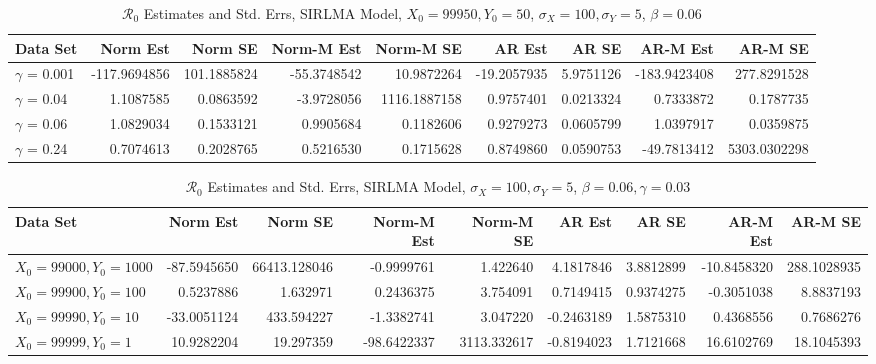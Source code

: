 \documentclass[12pt]{article}
\newcommand{\rr}{\ensuremath{\mathcal{R}_0}}
\begin{document}
\begin{table}[H]
	
	\caption{\label{tab:}$\rr$ Estimates and Std. Errs, SIRLMA Model,
		$X_0 = 99950, Y_0 = 50$, $\sigma_X = 100, \sigma_Y = 5$, $\beta = 0.06$}
	\centering
	\begin{footnotesize}
		\begin{tabular}[t]{l|r|r|r|r|r|r|r|r}
			\hline
			Data Set & Norm Est & Norm SE & Norm-M Est & Norm-M SE & AR Est & AR SE & AR-M Est & AR-M SE\\
			\hline
			$\gamma$ = 0.001 & -117.9694856 & 101.1885824 & -55.3748542 & 10.9872264 & -19.2057935 & 5.9751126 & -183.9423408 & 277.8291528\\
			\hline
			$\gamma$ = 0.04 & 1.1087585 & 0.0863592 & -3.9728056 & 1116.1887158 & 0.9757401 & 0.0213324 & 0.7333872 & 0.1787735\\
			\hline
			$\gamma$ = 0.06 & 1.0829034 & 0.1533121 & 0.9905684 & 0.1182606 & 0.9279273 & 0.0605799 & 1.0397917 & 0.0359875\\
			\hline
			$\gamma$ = 0.24 & 0.7074613 & 0.2028765 & 0.5216530 & 0.1715628 & 0.8749860 & 0.0590753 & -49.7813412 & 5303.0302298\\
			\hline
		\end{tabular}
	\end{footnotesize}
\end{table}

\begin{table}[H]
	
	\caption{\label{tab:}$\rr$ Estimates and Std. Errs, SIRLMA Model,
		$\sigma_X = 100, \sigma_Y = 5$, $\beta = 0.06, \gamma = 0.03$}
	\centering
	\begin{footnotesize}
		\begin{tabular}[t]{l|r|r|r|r|r|r|r|r}
			\hline
			Data Set & Norm Est & Norm SE & Norm-M Est & Norm-M SE & AR Est & AR SE & AR-M Est & AR-M SE\\
			\hline
			$X_0 = 99000, Y_0 = 1000$ & -87.5945650 & 66413.128046 & -0.9999761 & 1.422640 & 4.1817846 & 3.8812899 & -10.8458320 & 288.1028935\\
			\hline
			$X_0 = 99900, Y_0 = 100$ & 0.5237886 & 1.632971 & 0.2436375 & 3.754091 & 0.7149415 & 0.9374275 & -0.3051038 & 8.8837193\\
			\hline
			$X_0 = 99990, Y_0 = 10$ & -33.0051124 & 433.594227 & -1.3382741 & 3.047220 & -0.2463189 & 1.5875310 & 0.4368556 & 0.7686276\\
			\hline
			$X_0 = 99999, Y_0 = 1$ & 10.9282204 & 19.297359 & -98.6422337 & 3113.332617 & -0.8194023 & 1.7121668 & 16.6102769 & 18.1045393\\
			\hline
		\end{tabular}
	\end{footnotesize}
\end{table}
\end{document}
